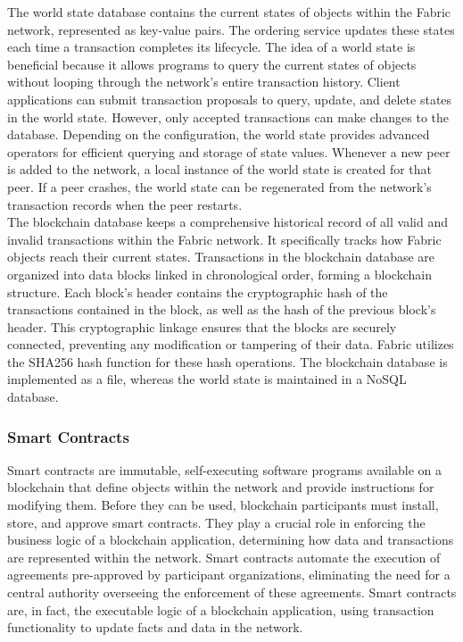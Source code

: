 \documentclass[conference]{IEEEtran}
\begin{document}
The world state database contains the current states of objects within the Fabric network, represented as key-value pairs. The ordering service updates these states each time a transaction completes its lifecycle. The idea of a world state is beneficial because it allows programs to query the current states of objects without looping through the network's entire transaction history. Client applications can submit transaction proposals to query, update, and delete states in the world state. However, only accepted transactions can make changes to the database. Depending on the configuration, the world state provides advanced operators for efficient querying and storage of state values. Whenever a new peer is added to the network, a local instance of the world state is created for that peer. If a peer crashes, the world state can be regenerated from the network's transaction records when the peer restarts. \\ 

The blockchain database keeps a comprehensive historical record of all valid and invalid transactions within the Fabric network. It specifically tracks how Fabric objects reach their current states. Transactions in the blockchain database are organized into data blocks linked in chronological order, forming a blockchain structure. Each block's header contains the cryptographic hash of the transactions contained in the block, as well as the hash of the previous block's header. This cryptographic linkage ensures that the blocks are securely connected, preventing any modification or tampering of their data. Fabric utilizes the SHA256 hash function for these hash operations. The blockchain database is implemented as a file, whereas the world state is maintained in a NoSQL database. \\

\subsubsection{Smart Contracts} 
Smart contracts are immutable, self-executing software programs available on a blockchain that define objects within the network and provide instructions for modifying them. Before they can be used, blockchain participants must install, store, and approve smart contracts. They play a crucial role in enforcing the business logic of a blockchain application, determining how data and transactions are represented within the network. Smart contracts automate the execution of agreements pre-approved by participant organizations, eliminating the need for a central authority overseeing the enforcement of these agreements. Smart contracts are, in fact, the executable logic of a blockchain application, using transaction functionality to update facts and data in the network. \\
\end{document}
